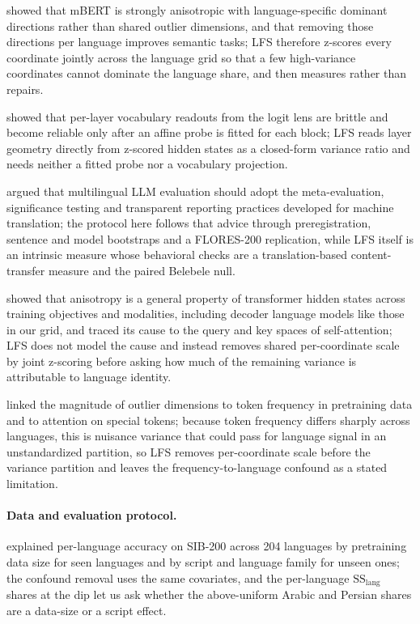 \documentclass[11pt,a4paper]{article}
\begin{document}
\citet{rajaee2022isotropy} showed that mBERT is strongly anisotropic with language-specific dominant directions rather than shared outlier dimensions, and that removing those directions per language improves semantic tasks; LFS therefore z-scores every coordinate jointly across the language grid so that a few high-variance coordinates cannot dominate the language share, and then measures rather than repairs.

\citet{belrose2023tuned} showed that per-layer vocabulary readouts from the logit lens are brittle and become reliable only after an affine probe is fitted for each block; LFS reads layer geometry directly from z-scored hidden states as a closed-form variance ratio and needs neither a fitted probe nor a vocabulary projection.

\citet{kreutzer2025dejavu} argued that multilingual LLM evaluation should adopt the meta-evaluation, significance testing and transparent reporting practices developed for machine translation; the protocol here follows that advice through preregistration, sentence and model bootstraps and a FLORES-200 replication, while LFS itself is an intrinsic measure whose behavioral checks are a translation-based content-transfer measure and the paired Belebele null.

\citet{godey2024anisotropy} showed that anisotropy is a general property of transformer hidden states across training objectives and modalities, including decoder language models like those in our grid, and traced its cause to the query and key spaces of self-attention; LFS does not model the cause and instead removes shared per-coordinate scale by joint z-scoring before asking how much of the remaining variance is attributable to language identity.

\citet{puccetti2022outlier} linked the magnitude of outlier dimensions to token frequency in pretraining data and to attention on special tokens; because token frequency differs sharply across languages, this is nuisance variance that could pass for language signal in an unstandardized partition, so LFS removes per-coordinate scale before the variance partition and leaves the frequency-to-language confound as a stated limitation.

\paragraph{Data and evaluation protocol.}
\citet{bagherinezhad2024drives} explained per-language accuracy on SIB-200 across 204 languages by pretraining data size for seen languages and by script and language family for unseen ones; the confound removal uses the same covariates, and the per-language $\mathrm{SS}_{\mathrm{lang}}$ shares at the dip let us ask whether the above-uniform Arabic and Persian shares are a data-size or a script effect.
\end{document}
